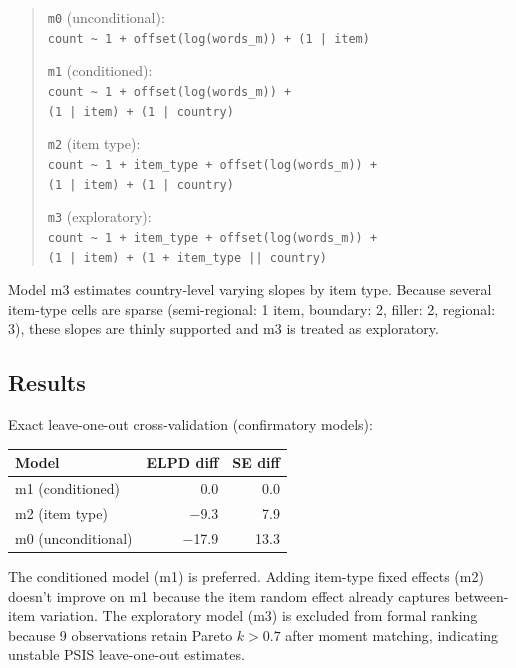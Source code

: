 \documentclass[12pt]{article}
\begin{document}
\begin{quote}
\small
\noindent\texttt{m0} (unconditional):\\
\texttt{count \textasciitilde{} 1 + offset(log(words\_m)) + (1~|~item)}

\noindent\texttt{m1} (conditioned):\\
\texttt{count \textasciitilde{} 1 + offset(log(words\_m)) +}\\
\texttt{(1~|~item) + (1~|~country)}

\noindent\texttt{m2} (item type):\\
\texttt{count \textasciitilde{} 1 + item\_type + offset(log(words\_m)) +}\\
\texttt{(1~|~item) + (1~|~country)}

\noindent\texttt{m3} (exploratory):\\
\texttt{count \textasciitilde{} 1 + item\_type + offset(log(words\_m)) +}\\
\texttt{(1~|~item) + (1~+~item\_type~||~country)}
\end{quote}

Model m3 estimates country-level varying slopes by item type. Because
several item-type cells are sparse (semi-regional: 1 item, boundary: 2,
filler: 2, regional: 3), these slopes are thinly supported and m3 is
treated as exploratory.

\subsection{Results}

Exact leave-one-out cross-validation (confirmatory models):

\begin{center}
\begin{tabular}{lrr}
  \hline
  Model & ELPD diff & SE diff \\
  \hline
  m1 (conditioned) & 0.0 & 0.0 \\
  m2 (item type) & $-$9.3 & 7.9 \\
  m0 (unconditional) & $-$17.9 & 13.3 \\
  \hline
\end{tabular}
\end{center}

The conditioned model (m1) is preferred. Adding item-type fixed effects
(m2) doesn't improve on m1 because the item random effect already
captures between-item variation. The exploratory model (m3) is excluded
from formal ranking because 9 observations retain Pareto $k > 0.7$
after moment matching, indicating unstable PSIS leave-one-out estimates.
\end{document}
